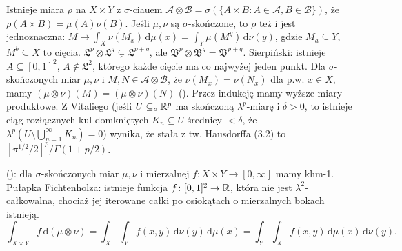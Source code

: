 Istnieje  miara $\rho$ na $X \times Y$ z $\sigma$-ciauem $\mathcal A \otimes \mathcal B = \sigma(\{A \times B : A \in \mathcal A, B \in \mathcal B\})$, że $\rho(A \times B) = \mu(A) \nu(B)$.
Jeśli $\mu, \nu$ są $\sigma$-skończone, to $\rho$ też i jest jednoznaczna:  $M \mapsto \int_X \nu(M_x) \,\textrm{d}\mu(x) = \int_Y \mu(M^y) \,\textrm{d}\nu(y)$, gdzie $M_a \subseteq Y$, $M^b \subseteq X$ to cięcia.
$\mathfrak L^p \otimes \mathfrak L^q \subsetneq \mathfrak L^{p+q}$, ale $\mathfrak B^p \otimes \mathfrak B^q = \mathfrak B^{p+q}$.
Sierpiński: istnieje $A \subseteq [0,1]^2$, $A \not \in \mathfrak L^2$, którego każde cięcie ma co najwyżej jeden punkt.
Dla $\sigma$-skończonych miar $\mu, \nu$ i $M, N \in \mathcal A \otimes \mathcal B$, że $\nu (M_x) = \nu(N_x)$ dla p.w. $x \in X$, mamy $(\mu \otimes \nu)(M) = (\mu \otimes \nu)(N)$ ().
Przez indukcję mamy wyższe miary produktowe.
Z  Vitaliego (jeśli $U \subseteq_o \mathbb{R}^p$ ma skończoną $\lambda^p$-miarę i $\delta >0$, to istnieje ciąg rozłącznych kul domkniętych $K_n \subseteq U$ średnicy $< \delta$, że $\lambda^p(U \setminus \bigcup_{n=1}^\infty K_n) = 0$) wynika, że stała z tw. Hausdorffa (3.2) to $[\pi^{1/2}/2]^p / \Gamma(1+p/2)$.

  (): dla $\sigma$-skończonych miar $\mu, \nu$ i mierzalnej $f \colon X \times Y \to [0, \infty]$ mamy khm-1.
Pułapka Fichtenholza: istnieje funkcja $f \colon [0,1]^2 \to \mathbb{R}$, która nie jest $\lambda^2$-całkowalna, chociaż jej iterowane całki po osiokątach o mierzalnych bokach istnieją.
\[
	\int_{X \times Y} f \,\textrm{d} (\mu \otimes \nu) = \int_X \int_Y f(x,y) \,\textrm{d} \nu(y) \,\textrm{d} \mu(x) = \int_Y \int_X f(x,y) \,\textrm{d} \mu(x) \,\textrm{d} \nu(y).
\]